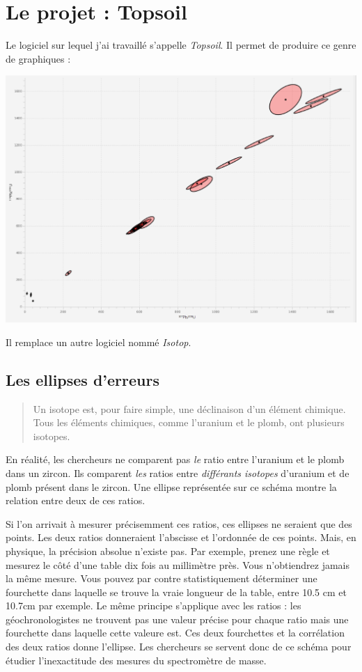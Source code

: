 \section{Le projet : Topsoil}
Le logiciel sur lequel j'ai travaillé s'appelle \textit{Topsoil}. Il permet de produire ce genre de graphiques :
\begin{center}
\includegraphics[width=15cm]{./illustrations/graphique.eps}
\end{center}
Il remplace un autre logiciel nommé \textit{Isotop}.

\subsection{Les ellipses d'erreurs}

\begin{quote}
Un isotope est, pour faire simple, une déclinaison d'un élément chimique. Tous les éléments chimiques, comme l'uranium et le plomb, ont plusieurs isotopes.
\end{quote}

En réalité, les chercheurs ne comparent pas \emph{le} ratio entre l'uranium et le plomb dans un zircon. Ils comparent \emph{les} ratios entre \emph{différants isotopes} d'uranium et de plomb présent dans le zircon.
Une ellipse représentée sur ce schéma montre la relation entre deux de ces ratios.

Si l'on arrivait à mesurer précisemment ces ratios, ces ellipses ne seraient que des points. Les deux ratios donneraient l'abscisse et l'ordonnée de ces points. Mais, en physique, la précision absolue n'existe pas. Par exemple, prenez une règle et mesurez le côté d'une table dix fois au millimètre près. Vous n'obtiendrez jamais la même mesure. Vous pouvez par contre statistiquement déterminer une fourchette dans laquelle se trouve la vraie longueur de la table, entre 10.5 cm et 10.7cm par exemple. Le même principe s'applique avec les ratios : les géochronologistes ne trouvent pas une valeur précise pour chaque ratio mais une fourchette dans laquelle cette valeure est. Ces deux fourchettes et la corrélation des deux ratios donne l'ellipse. Les chercheurs se servent donc de ce schéma pour étudier l'inexactitude des mesures du spectromètre de masse.

